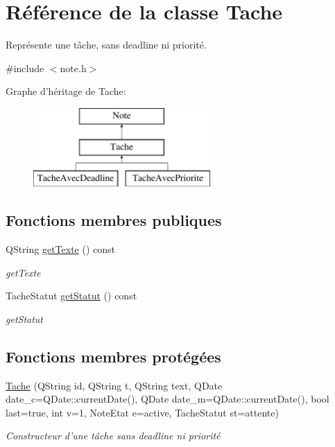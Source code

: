 \hypertarget{class_tache}{\section{Référence de la classe Tache}
\label{class_tache}
}


Représente une tâche, sans deadline ni priorité.  




{\ttfamily \#include $<$note.\-h$>$}

Graphe d'héritage de Tache\-:\begin{figure}[H]
\begin{center}
\leavevmode
\includegraphics[height=3.000000cm]{class_tache}
\end{center}
\end{figure}
\subsection*{Fonctions membres publiques}
\begin{DoxyCompactItemize}
\item 
Q\-String \hyperlink{class_tache_add34adcc7d4fb26078afaae3b92bdd76}{get\-Texte} () const 
\begin{DoxyCompactList}\small\item\em get\-Texte \end{DoxyCompactList}\item 
Tache\-Statut \hyperlink{class_tache_a9507985ede212921bdc47c722d2e56b1}{get\-Statut} () const 
\begin{DoxyCompactList}\small\item\em get\-Statut \end{DoxyCompactList}\end{DoxyCompactItemize}
\subsection*{Fonctions membres protégées}
\begin{DoxyCompactItemize}
\item 
\hyperlink{class_tache_a2c7f6baff58554458a0cf3edb28a24c4}{Tache} (Q\-String id, Q\-String t, Q\-String text, Q\-Date date\-\_\-c=Q\-Date\-::current\-Date(), Q\-Date date\-\_\-m=Q\-Date\-::current\-Date(), bool last=true, int v=1, Note\-Etat e=active, Tache\-Statut st=attente)
\begin{DoxyCompactList}\small\item\em Constructeur d'une tâche sans deadline ni priorité \end{DoxyCompactList}\end{DoxyCompactItemize}
